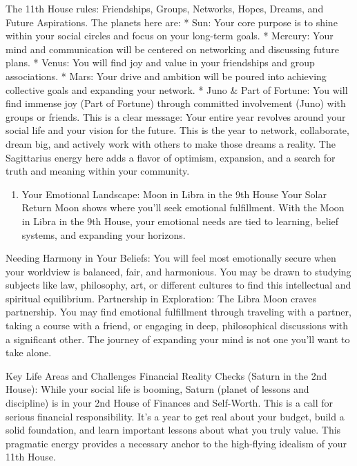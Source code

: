 \documentclass{article}
\begin{document}
The 11th House rules: Friendships, Groups, Networks, Hopes, Dreams, and Future Aspirations. The planets here are: * Sun: Your core purpose is to shine within your social circles and focus on your long-term goals. * Mercury: Your mind and communication will be centered on networking and discussing future plans. * Venus: You will find joy and value in your friendships and group associations. * Mars: Your drive and ambition will be poured into achieving collective goals and expanding your network. * Juno \& Part of Fortune: You will find immense joy (Part of Fortune) through committed involvement (Juno) with groups or friends. This is a clear message: Your entire year revolves around your social life and your vision for the future. This is the year to network, collaborate, dream big, and actively work with others to make those dreams a reality. The Sagittarius energy here adds a flavor of optimism, expansion, and a search for truth and meaning within your community.

\begin{enumerate}
\item
  Your Emotional Landscape: Moon in Libra in the 9th House Your Solar Return Moon shows where you'll seek emotional fulfillment. With the Moon in Libra in the 9th House, your emotional needs are tied to learning, belief systems, and expanding your horizons.
\end{enumerate}

Needing Harmony in Your Beliefs: You will feel most emotionally secure when your worldview is balanced, fair, and harmonious. You may be drawn to studying subjects like law, philosophy, art, or different cultures to find this intellectual and spiritual equilibrium. Partnership in Exploration: The Libra Moon craves partnership. You may find emotional fulfillment through traveling with a partner, taking a course with a friend, or engaging in deep, philosophical discussions with a significant other. The journey of expanding your mind is not one you'll want to take alone.

Key Life Areas and Challenges Financial Reality Checks (Saturn in the 2nd House): While your social life is booming, Saturn (planet of lessons and discipline) is in your 2nd House of Finances and Self-Worth. This is a call for serious financial responsibility. It's a year to get real about your budget, build a solid foundation, and learn important lessons about what you truly value. This pragmatic energy provides a necessary anchor to the high-flying idealism of your 11th House.
\end{document}
